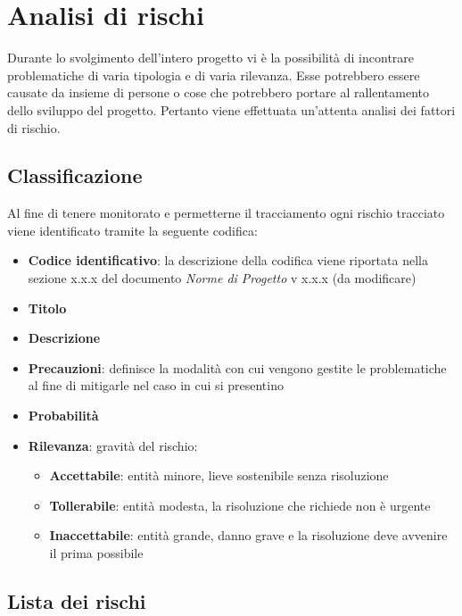 \section{Analisi di rischi}

Durante lo svolgimento dell’intero progetto vi è la possibilità di incontrare problematiche di varia tipologia e di varia rilevanza. 
Esse potrebbero essere causate da insieme di persone o cose che potrebbero portare al rallentamento dello sviluppo del progetto. 
Pertanto viene effettuata un'attenta analisi dei fattori di rischio. 

\subsection{Classificazione}
Al fine di tenere monitorato e permetterne il tracciamento ogni  rischio tracciato viene identificato tramite la seguente codifica:
\begin{itemize}
    \item \textbf{Codice identificativo}: la descrizione della codifica viene riportata nella sezione x.x.x del documento \textit{Norme di Progetto} v x.x.x (da modificare)
    \item \textbf{Titolo}
    \item \textbf{Descrizione}
    \item \textbf{Precauzioni}: definisce la modalità con cui vengono gestite le problematiche al fine di mitigarle nel caso in cui si presentino
    \item \textbf{Probabilità}
    \item \textbf{Rilevanza}: gravità del rischio:
    \begin{itemize}
        \item \textbf{Accettabile}: entità minore, lieve sostenibile senza risoluzione
        \item \textbf{Tollerabile}: entità modesta, la risoluzione che richiede non è urgente
        \item \textbf{Inaccettabile}: entità grande, danno grave e la risoluzione deve avvenire il prima possibile
    \end{itemize}
\end{itemize}

\subsection{Lista dei rischi}

